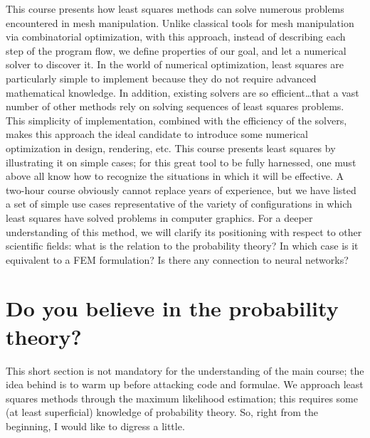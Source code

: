 \documentclass[notitlepage,oneside]{book}
\makeatletter
\newcommand{\authoredby}[1]{\addtocontents{toc}{\protect\@nameuse{authoredby#1}}}%
\makeatother
\begin{document}
This course presents how least squares methods can solve numerous problems encountered in mesh manipulation.
Unlike classical tools for mesh manipulation via combinatorial optimization, with this approach, instead of describing each step of the program flow,
we define properties of our goal, and let a numerical solver to discover it.
In the world of numerical optimization, least squares are particularly simple to implement because they do not require advanced mathematical knowledge.
In addition, existing solvers are so efficient\dots that a vast number of other methods rely on solving sequences of least squares problems.
This simplicity of implementation, combined with the efficiency of the solvers, makes this approach the ideal candidate to introduce some numerical optimization in design, rendering, etc.
This course presents least squares by illustrating it on simple cases; for this great tool to be fully harnessed, one must above all know how to recognize the situations in which it will be effective.
A two-hour course obviously cannot replace years of experience, but we have listed a set of simple use cases representative of the variety of configurations in which least squares have solved problems in computer graphics.
For a deeper understanding of this method, we will clarify its positioning with respect to other scientific fields: what is the relation to the probability theory?
In which case is it equivalent to a FEM formulation? Is there any connection to neural networks?
\fi













\authoredby{A}
\chapter{Do you believe in the probability theory?}
\fancyhead[R]{\textcolor{blue}{optional reading}}

This short section is not mandatory for the understanding of the main course; the idea behind is to warm up before attacking code and formulae.
We approach least squares methods through the maximum likelihood estimation; this requires some (at least superficial) knowledge of probability theory.
So, right from the beginning, I would like to digress a little.
\end{document}
